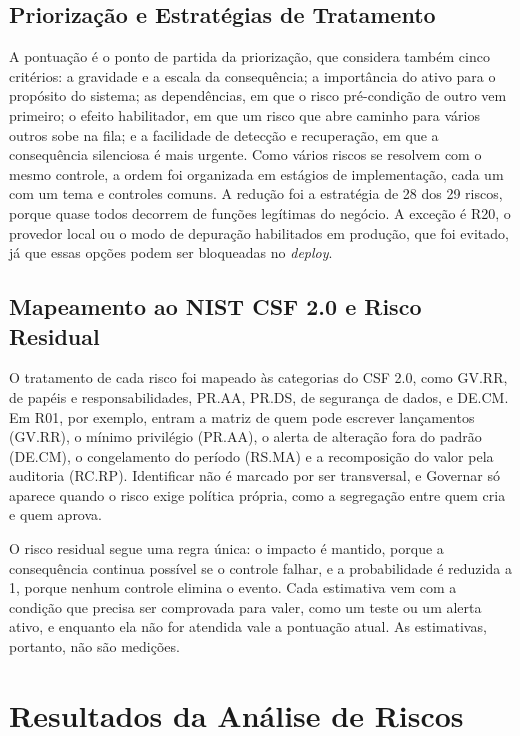 \documentclass[conference]{IEEEtran}
\begin{document}
\subsection{Priorização e Estratégias de Tratamento}
\label{subsec:priorizacao}

A pontuação é o ponto de partida da priorização, que considera também cinco critérios: a gravidade e a escala da consequência; a importância do ativo para o propósito do sistema; as dependências, em que o risco pré-condição de outro vem primeiro; o efeito habilitador, em que um risco que abre caminho para vários outros sobe na fila; e a facilidade de detecção e recuperação, em que a consequência silenciosa é mais urgente. Como vários riscos se resolvem com o mesmo controle, a ordem foi organizada em estágios de implementação, cada um com um tema e controles comuns. A redução foi a estratégia de 28 dos 29 riscos, porque quase todos decorrem de funções legítimas do negócio. A exceção é R20, o provedor local ou o modo de depuração habilitados em produção, que foi evitado, já que essas opções podem ser bloqueadas no \textit{deploy}.

\subsection{Mapeamento ao NIST CSF 2.0 e Risco Residual}
\label{subsec:met-csf}

O tratamento de cada risco foi mapeado às categorias do CSF 2.0, como GV.RR, de papéis e responsabilidades, PR.AA, PR.DS, de segurança de dados, e DE.CM. Em R01, por exemplo, entram a matriz de quem pode escrever lançamentos (GV.RR), o mínimo privilégio (PR.AA), o alerta de alteração fora do padrão (DE.CM), o congelamento do período (RS.MA) e a recomposição do valor pela auditoria (RC.RP). Identificar não é marcado por ser transversal, e Governar só aparece quando o risco exige política própria, como a segregação entre quem cria e quem aprova.

O risco residual segue uma regra única: o impacto é mantido, porque a consequência continua possível se o controle falhar, e a probabilidade é reduzida a 1, porque nenhum controle elimina o evento. Cada estimativa vem com a condição que precisa ser comprovada para valer, como um teste ou um alerta ativo, e enquanto ela não for atendida vale a pontuação atual. As estimativas, portanto, não são medições.

\section{Resultados da Análise de Riscos}
\label{sec:resultados}
\end{document}

